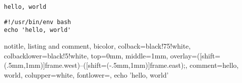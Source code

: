 \documentclass{article}
\begin{document}
  
\begin{tcolorbox}[title=\textbf{echo 'hello, world'}]
\begin{verbatim}
hello, world
\end{verbatim}
\end{tcolorbox}

\begin{tcolorbox}[title=\textbf{hello\_world.sh}]
\begin{verbatim}
#!/usr/bin/env bash
echo 'hello, world'
\end{verbatim}
\end{tcolorbox}

\begin{tcblisting}{notitle, 
  listing and comment,
  bicolor,
  colback=black!75!white,
  colbacklower=black!5!white,
  top=0mm, middle=1mm,
  overlay={\draw[line width=1.05mm, black!5!white, opacity=1] ([shift={(.5mm,1mm)}]frame.west)--([shift={(-.5mm,1mm)}]frame.east);},
  comment={hello, world}, 
  colupper=white,
  fontlower=\ttfamily,}
echo 'hello, world'
\end{tcblisting}
\end{document}
